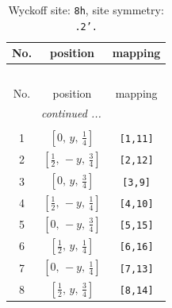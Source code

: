 \documentclass[fleqn,8pt]{jsarticle}
\begin{document}
\begin{longtable}{ccc}
\caption{Wyckoff site: {\tt 8h}, site symmetry: {\tt .2'.}}
 \\
 \hline \hline
No. & position & mapping \\ \hline \endfirsthead

\multicolumn{2}{l}{\tablename\ \thetable{}} \\
 \hline \hline
No. & position & mapping \\ \hline \endhead

 \hline \hline
\multicolumn{2}{r}{\footnotesize\it continued ...} \\ \endfoot

 \hline \hline
\multicolumn{2}{r}{} \\ \endlastfoot

1 & $\left[ 0,\, y,\, \frac{1}{4} \right]$ & {\tt [1,11]} \\ \hline
2 & $\left[ \frac{1}{2},\, - y,\, \frac{3}{4} \right]$ & {\tt [2,12]} \\ \hline
3 & $\left[ 0,\, y,\, \frac{3}{4} \right]$ & {\tt [3,9]} \\ \hline
4 & $\left[ \frac{1}{2},\, - y,\, \frac{1}{4} \right]$ & {\tt [4,10]} \\ \hline
5 & $\left[ 0,\, - y,\, \frac{3}{4} \right]$ & {\tt [5,15]} \\ \hline
6 & $\left[ \frac{1}{2},\, y,\, \frac{1}{4} \right]$ & {\tt [6,16]} \\ \hline
7 & $\left[ 0,\, - y,\, \frac{1}{4} \right]$ & {\tt [7,13]} \\ \hline
8 & $\left[ \frac{1}{2},\, y,\, \frac{3}{4} \right]$ & {\tt [8,14]} \\
\end{longtable}
\renewcommand{\arraystretch}{1.2}
\end{document}
